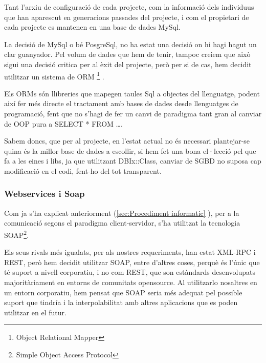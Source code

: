 \documentclass[titlepage,a4paper,12pt]{book}
\begin{document}
Tant l'arxiu de configuració de cada projecte, com la informació dels individuus
que han aparescut en generacions passades del projecte, i com el propietari de
cada projecte es mantenen en una base de dades MySql.

La decisió de MySql o bé PosgreSql, no ha estat una decisió on hi hagi hagut un
clar guanyador.  Pel volum de dades que hem de tenir, tampoc creiem que això
sigui una decisió critica per al èxit del projecte, però per si de cas, hem
decidit utilitzar un sistema de ORM \footnote{Object Relational Mapper} .

Els ORMs són llibreries que mapegen taules Sql a objectes del llenguatge, podent
així fer més directe el tractament amb bases de dades desde llenguatges de
programació, fent que no s'hagi de fer un canvi de paradigma tant gran al
canviar de OOP pura a SELECT * FROM \ldots  .

Sabem doncs, que per al projecte, en l'estat actual no és necessari plantejar-se
quina és la millor base de dades a escollir, si hem fet una bona el·lecció pel
que fa a les eines i libs, ja que utilitzant DBIx::Class, canviar de SGBD no
suposa cap modificació en el codi, fent-ho del tot transparent.


\subsubsection{Webservices i Soap} %
\label{ssub:WS i Soap}

Com ja s'ha explicat anteriorment (\ref{sec:Procediment informatic} ), per a la
comunicació segons el paradigma client-servidor, s'ha utilitzat la tecnologia
SOAP\footnote{Simple Object Access Protocol}.

Els seus rivals més igualats, per als nostres requeriments, han estat XML-RPC i
REST, però hem decidit utilitzar SOAP, entre d'altres coses, perquè és l'únic
que té suport a nivell corporatiu, i no com REST, que son estàndards
desenvolupats majoritàriament en entorns de comunitats opensource.  Al
utilitzarlo nosaltres en un entorn corporatiu, hem pensat que SOAP seria més
adequat pel possible suport que tindría i la interpolabilitat amb altres
aplicacions que es poden utilitzar en el futur.

\end{document}
